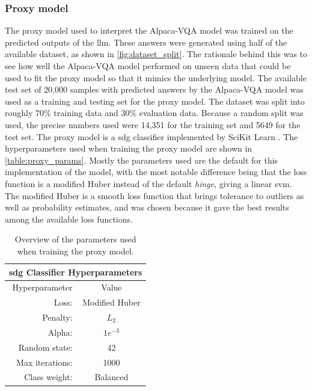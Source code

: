     \subsubsection{Proxy model}
    The proxy model used to interpret the Alpaca-VQA model was trained on the predicted outputs of the \gls{llm}. These answers were generated using half of the available dataset, as shown in \autoref{fig:dataset_split}. The rationale behind this was to see how well the Alpaca-VQA model performed on unseen data that could be used to fit the proxy model so that it mimics the underlying model. 
    The available test set of 20,000 samples with predicted answers by the Alpaca-VQA model was used as a training and testing set for the proxy model. The dataset was split into roughly 70\% training data and 30\% evaluation data. Because a random split was used, the precise numbers used were 14,351 for the training set and 5649 for the test set.
    The proxy model is a \gls{sdg} classifier implemented by SciKit Learn \cite{SklearnLinearModel}.
    The hyperparameters used when training the proxy model are shown in \autoref{table:proxy_params}. Mostly the parameters used are the default for this implementation of the model, with the most notable difference being that the loss function is a modified Huber instead of the default \textit{hinge}, giving a linear \gls{svm}. 
    The modified Huber is a smooth loss function that brings tolerance to
    outliers as well as probability estimates, and was chosen because it gave the best results among the available loss functions.
    

    \begin{table}[htb]
    \centering
    \begin{tabular}{ r c } 
        \multicolumn{2}{c}{\textbf{\gls{sdg} Classifier Hyperparameters}}\\ 
        \toprule
           Hyperparameter & Value \\
        \midrule
            Loss: & Modified Huber\\
            Penalty: & $L_2$\\
            Alpha: & $1e^{-3}$\\
            Random state: & 42\\
            Max iterations: & 1000\\
            Class weight: & Balanced\\[0.5ex]
        \bottomrule
    \end{tabular}
    \caption{Overview of the parameters used when training the proxy model.}
    \label{table:proxy_params}
    \end{table}
    

